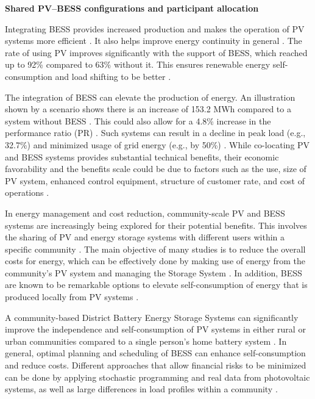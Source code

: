 
\noindent\textbf{Shared PV--BESS configurations and participant
allocation}\par

Integrating BESS provides increased production and makes the operation
of PV systems more efficient \cite{ch2ref040}. It also helps improve energy
continuity in general \cite{ch2ref040}. The rate of using PV improves
significantly with the support of BESS, which reached up to 92\%
compared to 63\% without it. This ensures renewable energy
self-consumption and load shifting to be better \cite{ch2ref040}.

The integration of BESS can elevate the production of energy. An
illustration shown by a scenario shows there is an increase of 153.2 MWh
compared to a system without BESS \cite{ch2ref040}. This could also allow for a
4.8\% increase in the performance ratio (PR) \cite{ch2ref040}. Such systems can
result in a decline in peak load (e.g., 32.7\%) and minimized usage of
grid energy (e.g., by 50\%) \cite{ch2ref040}. While co-locating PV and BESS
systems provides substantial technical benefits, their economic
favorability and the benefits scale could be due to factors such as the
use, size of PV system, enhanced control equipment, structure of
customer rate, and cost of operations \cite{ch2ref040}.

In energy management and cost reduction, community-scale PV and BESS
systems are increasingly being explored for their potential benefits.
This involves the sharing of PV and energy storage systems with
different users within a specific community
\cite{ch2ref041,ch2ref042}. The main objective of many studies is to reduce
the overall costs for energy, which can be effectively done by making use
of energy from the community's PV system and managing the Storage System
\cite{ch2ref041}. In addition, BESS are known to be remarkable options to
elevate self-consumption of energy that is produced locally from PV
systems \cite{ch2ref043}.

A community-based District Battery Energy Storage Systems can
significantly improve the independence and self-consumption of PV
systems in either rural or urban communities compared to a single
person's home battery system \cite{ch2ref044}. In general, optimal planning
and scheduling of BESS can enhance self-consumption and reduce costs.
Different approaches that allow financial risks to be minimized can be
done by applying stochastic programming and real data from photovoltaic
systems, as well as large differences in load profiles within a
community \cite{ch2ref041}.


